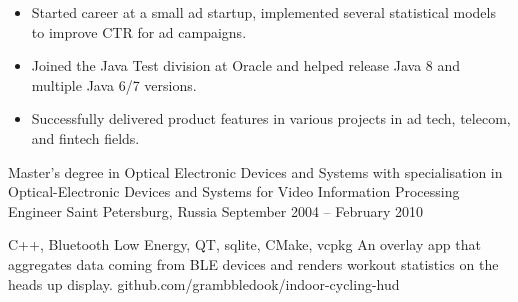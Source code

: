 \documentclass[a4paper,10pt]{article}
\begin{document}
    \begin{itemize}
        \item Started career at a small ad startup, implemented several statistical models to improve CTR for ad campaigns.
        \item Joined the Java Test division at Oracle and helped release Java 8 and multiple Java 6/7 versions.
        \item Successfully delivered product features in various projects in ad tech, telecom, and fintech fields.
    \end{itemize}


    {Master's degree in Optical Electronic Devices and Systems with specialisation in Optical-Electronic Devices
    and Systems for Video Information Processing}
    {Engineer}
    {Saint Petersburg, Russia}
    {September 2004 -- February 2010}


    {C++, Bluetooth Low Energy, QT, sqlite, CMake, vcpkg}
    {An overlay app that aggregates data coming from BLE devices and renders workout statistics on the heads up display.}
    {github.com/grambbledook/indoor-cycling-hud}
\end{document}
